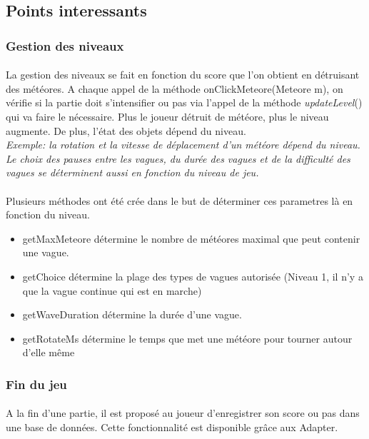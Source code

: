 \documentclass{article}
\begin{document}
\subsection{Points interessants}
\subsubsection{Gestion des niveaux}
\paragraph{} La gestion des niveaux se fait en fonction du score que l'on obtient en détruisant des météores. A chaque appel de la méthode onClickMeteore(Meteore m), on vérifie si la partie doit s'intensifier ou pas via l'appel de la méthode \textit{updateLevel}() qui va faire le nécessaire. Plus le joueur détruit de météore, plus le niveau augmente. De plus, l'état des objets dépend du niveau. \\
\textit{Exemple: la rotation et la vitesse de déplacement d'un météore dépend du niveau. Le choix des pauses entre les vagues, du durée des vagues et de la difficulté des vagues se déterminent aussi en fonction du niveau de jeu. }

\paragraph{}Plusieurs méthodes ont été crée dans le but de déterminer ces parametres là en fonction du niveau.
\begin{itemize}
    \item getMaxMeteore détermine le nombre de météores maximal que peut contenir une vague.
    \item getChoice   détermine la plage des types de vagues autorisée (Niveau 1, il n'y a que la vague continue qui est en marche)
    \item getWaveDuration détermine la durée d'une vague.
    \item getRotateMs détermine le temps que met une météore pour tourner autour d'elle même
\end{itemize}

\subsubsection{Fin du jeu}
\paragraph{} A la fin d'une partie, il est proposé au joueur d'enregistrer son score ou pas dans une base de données. Cette fonctionnalité est disponible grâce aux Adapter.
\end{document}
